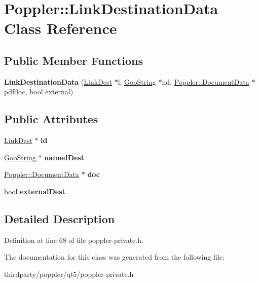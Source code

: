 \hypertarget{class_poppler_1_1_link_destination_data}{}\section{Poppler\+:\+:Link\+Destination\+Data Class Reference}
\label{class_poppler_1_1_link_destination_data}
\subsection*{Public Member Functions}
\begin{DoxyCompactItemize}
\item 
\mbox{\label{class_poppler_1_1_link_destination_data_abaae8b16195b307df8a790d033cd7862}} 
{\bfseries Link\+Destination\+Data} (\hyperlink{class_link_dest}{Link\+Dest} $\ast$l, \hyperlink{class_goo_string}{Goo\+String} $\ast$nd, \hyperlink{class_poppler_1_1_document_data}{Poppler\+::\+Document\+Data} $\ast$pdfdoc, bool external)
\end{DoxyCompactItemize}
\subsection*{Public Attributes}
\begin{DoxyCompactItemize}
\item 
\mbox{\label{class_poppler_1_1_link_destination_data_aae08d4bef871106c3eb3e4a1d88d08dd}} 
\hyperlink{class_link_dest}{Link\+Dest} $\ast$ {\bfseries ld}
\item 
\mbox{\label{class_poppler_1_1_link_destination_data_a3b64f2ecc793981a4868222fa6e5c55f}} 
\hyperlink{class_goo_string}{Goo\+String} $\ast$ {\bfseries named\+Dest}
\item 
\mbox{\label{class_poppler_1_1_link_destination_data_ac5047d787e4d72e0b5defec6ee238223}} 
\hyperlink{class_poppler_1_1_document_data}{Poppler\+::\+Document\+Data} $\ast$ {\bfseries doc}
\item 
\mbox{\label{class_poppler_1_1_link_destination_data_ad3abc479105c4a55d46b5482232e373e}} 
bool {\bfseries external\+Dest}
\end{DoxyCompactItemize}


\subsection{Detailed Description}


Definition at line 68 of file poppler-\/private.\+h.



The documentation for this class was generated from the following file\+:\begin{DoxyCompactItemize}
\item 
thirdparty/poppler/qt5/poppler-\/private.\+h\end{DoxyCompactItemize}

